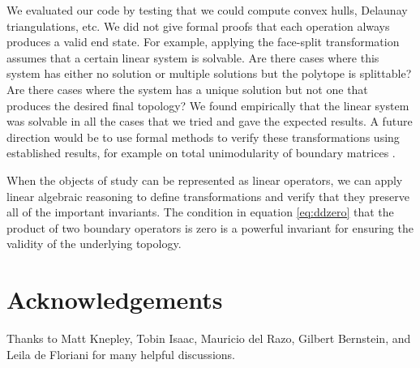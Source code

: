 \documentclass[twocolumn,leqno,twocolumn]{article}
\begin{document}
We evaluated our code by testing that we could compute convex hulls, Delaunay triangulations, etc.
We did not give formal proofs that each operation always produces a valid end state.
For example, applying the face-split transformation assumes that a certain linear system is solvable.
Are there cases where this system has either no solution or multiple solutions but the polytope is splittable?
Are there cases where the system has a unique solution but not one that produces the desired final topology?
We found empirically that the linear system was solvable in all the cases that we tried and gave the expected results.
A future direction would be to use formal methods to verify these transformations using established results, for example on total unimodularity of boundary matrices \cite{dey2010optimal}.

When the objects of study can be represented as linear operators, we can apply linear algebraic reasoning to define transformations and verify that they preserve all of the important invariants.
The condition in equation \eqref{eq:ddzero} that the product of two boundary operators is zero is a powerful invariant for ensuring the validity of the underlying topology.


\section*{Acknowledgements}

Thanks to Matt Knepley, Tobin Isaac, Mauricio del Razo, Gilbert Bernstein, and Leila de Floriani for many helpful discussions.



\end{document}
